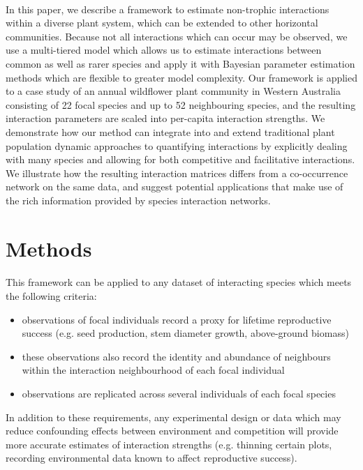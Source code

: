 \documentclass[a4,12pt]{article}
\begin{document}
    \paragraph{}
    In this paper, we describe a framework to estimate non-trophic interactions within a diverse plant system, which can be extended to other horizontal communities. Because not all interactions which can occur may be observed, we use a multi-tiered model which allows us to estimate interactions between common as well as rarer species and apply it with Bayesian parameter estimation methods which are flexible to greater model complexity.  Our framework is applied to a case study of an annual wildflower plant community in Western Australia consisting of 22 focal species and up to 52 neighbouring species, and the resulting interaction parameters are scaled into per-capita interaction strengths. We demonstrate how our method can integrate into and extend traditional plant population dynamic approaches to quantifying interactions by explicitly dealing with many species and allowing for both competitive and facilitative interactions. We illustrate how the resulting interaction matrices differs from a co-occurrence network on the same data, and suggest potential applications that make use of the rich information provided by species interaction networks.

    
\section{Methods}
    
    \paragraph{}
    This framework can be applied to any dataset of interacting species which meets the following criteria: 
    \begin{itemize}
        \item observations of focal individuals record a proxy for lifetime reproductive success (e.g. seed production, stem diameter growth, above-ground biomass)
        \item these observations also record the identity and abundance of neighbours within the interaction neighbourhood of each focal individual
        \item observations are replicated across several individuals of each focal species
    \end{itemize}
    In addition to these requirements, any experimental design or data which may reduce confounding effects between environment and competition will provide more accurate estimates of interaction strengths (e.g. thinning certain plots, recording environmental data known to affect reproductive success). 
    
\end{document}
